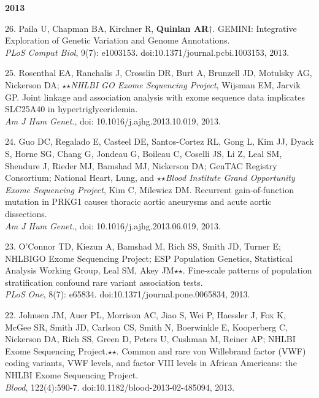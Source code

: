 \documentclass[margin,line]{cv}
\begin{document}
\begin{resume}
\begin{list}{*}{}
    \end{list}

    \textbf{2013} \\
    \begin{list}{*}{}

    \item[26.] Paila U, Chapman BA, Kirchner R, \textbf{Quinlan AR}$\dagger$.
    GEMINI: Integrative Exploration of Genetic Variation and Genome Annotations.\\
    \emph{PLoS Comput Biol}, 9(7): e1003153. doi:10.1371/journal.pcbi.1003153, 2013.

    \item[25.] Rosenthal EA, Ranchalis J, Crosslin DR, Burt A, Brunzell JD, Motulsky AG, Nickerson DA; $\star$$\star$\textit{NHLBI GO Exome Sequencing Project}, Wijsman EM, Jarvik GP.
    Joint linkage and association analysis with exome sequence data implicates SLC25A40 in hypertriglyceridemia.\\
    \emph{Am J Hum Genet.}, doi: 10.1016/j.ajhg.2013.10.019, 2013.

    \item[24.] Guo DC, Regalado E, Casteel DE, Santos-Cortez RL, Gong L, Kim JJ, Dyack S, Horne SG, Chang G, Jondeau G, Boileau C, Coselli JS, Li Z, Leal SM, Shendure J, Rieder MJ, Bamshad MJ, Nickerson DA; GenTAC Registry Consortium; National Heart, Lung, and $\star$$\star$\textit{Blood Institute Grand Opportunity Exome Sequencing Project}, Kim C, Milewicz DM.
    Recurrent gain-of-function mutation in PRKG1 causes thoracic aortic aneurysms and acute aortic dissections.\\
    \emph{Am J Hum Genet.}, doi: 10.1016/j.ajhg.2013.06.019, 2013.


    \item[23.] O'Connor TD, Kiezun A, Bamshad M, Rich SS, Smith JD, Turner E; NHLBIGO Exome Sequencing Project; ESP Population Genetics, Statistical Analysis Working Group, Leal SM, Akey JM$\star$$\star$. Fine-scale patterns of population stratification confound rare variant association tests.\\
    \emph{PLoS One}, 8(7): e65834. doi:10.1371/journal.pone.0065834, 2013.

    \item[22.] Johnsen JM, Auer PL, Morrison AC, Jiao S, Wei P, Haessler J, Fox K, McGee SR, Smith JD, Carlson CS, Smith N, Boerwinkle E, Kooperberg C, Nickerson DA, Rich SS, Green D, Peters U, Cushman M, Reiner AP; NHLBI Exome Sequencing Project.$\star$$\star$. Common and rare von Willebrand factor (VWF) coding variants, VWF levels, and factor VIII levels in African Americans: the NHLBI Exome Sequencing Project.\\
    \emph{Blood}, 122(4):590-7. doi:10.1182/blood-2013-02-485094, 2013.


\end{list}
\end{resume}
\end{document}
